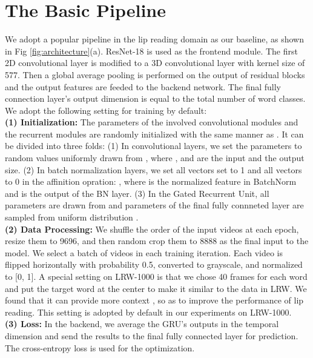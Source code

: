 \documentclass{article}
\begin{document}
\section{The Basic Pipeline}
\vspace{-0.5em}
\label{sec:pipeline}

We adopt a popular pipeline in the lip reading domain as our baseline, as shown in Fig \ref{fig:architecture}(a). ResNet-18 is used as the frontend module. The first 2D convolutional layer is modified to a 3D convolutional layer with kernel size of 577. Then a global average pooling is performed on the output of residual blocks and the output features are feeded to the backend network. The final fully connection layer's output dimension is equal to the total number of word classes. We adopt the following setting for training by default:
\vspace{0.5em}
\\
\indent\textbf{(1) Initialization:} The parameters of the involved convolutional modules and the recurrent modules are randomly initialized with the same manner as \cite{he2019bag}. It can be divided into three folds: (1) In convolutional layers, we set the parameters to random values uniformly drawn from , where ,  and  are the input and the output size. (2) In batch normalization layers, we set all  vectors set to 1 and all  vectors to 0 in the affinition opration: , where  is the normalized feature in BatchNorm and  is the output of the BN layer. (3) In the Gated Recurrent Unit, all parameters are drawn from  and parameters of the final fully connneted layer are sampled from uniform distribution . 
\vspace{0.5em}
\\
\indent\textbf{(2) Data Processing:} We shuffle the order of the input videos at each epoch, resize them to 9696, and then random crop them to 8888 as the final input to the model. We select a batch of videos in each training iteration. Each video is flipped horizontally with probability 0.5, converted to grayscale, and normalized to [0, 1]. A special setting on LRW-1000 is that we chose 40 frames for each word and put the target word at the center to make it similar to the data in LRW. We found that it can provide more context , so as to improve the performance of lip reading. This setting is adopted by default in our experiments on LRW-1000.
\vspace{0.5em}
\\
\indent\textbf{(3) Loss:} In the backend, we average the GRU's outputs in the temporal dimension and send the results to the final fully connected layer for prediction. The cross-entropy loss is used for the optimization.
\end{document}
